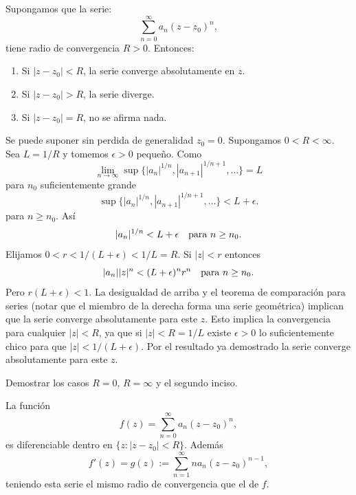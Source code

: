 \begin{teorema}  Supongamos que la serie:
\[
	\sum\limits_{n=0}^{\infty}a_n(z-z_0)^n,
\]
tiene radio de convergencia $R>0$. Entonces:
\begin{enumerate}
	\item Si $|z-z_0|<R$, la serie converge absolutamente en $z$.
	\item Si $|z-z_0|>R$, la serie diverge.
	\item Si $|z-z_0|=R$, no se afirma nada.

\end{enumerate}
\end{teorema}

 \begin{demo} Se puede suponer sin perdida de generalidad $z_0=0$. Supongamos $0<R<\infty$.  Sea $L=1/R$ y tomemos $\epsilon>0$ pequeño. Como
\[\lim_{n\to\infty}\sup\{|a_n|^{1/n},|a_{n+1}|^{1/n+1},\ldots\}=L\]
para $n_0$ suficientemente grande
\[\sup\{|a_n|^{1/n},|a_{n+1}|^{1/n+1},\ldots\}<L+\epsilon.\]
para $n\geq n_0$.   Así
\[|a_n|^{1/n}<L+\epsilon\quad\hbox{para } n\geq n_0.\]
Elijamos $0<r<1/(L+\epsilon)<1/L=R$. Si $|z|<r$ entonces
\[|a_n||z|^n<(L+\epsilon)^nr^n\quad\hbox{para } n\geq n_0.\]
Pero $r(L+\epsilon)<1$. La desigualdad de arriba y el teorema de comparación para series (notar que el miembro de la derecha forma una serie geométrica) implican que la serie converge absolutamente para este $z$.  Esto implica la convergencia para cualquier $|z|<R$, ya que si $|z|<R=1/L$ existe $\epsilon>0$ lo suficientemente chico para que $|z|<1/(L+\epsilon)$. Por el resultado ya demostrado la serie converge absolutamente para este $z$.\end{demo}
\begin{ejercicio} Demostrar los casos $R=0$, $R=\infty$ y el segundo inciso.
 \end{ejercicio}
\begin{teorema}  La función
\[
f(z)=	\sum\limits_{n=0}^{\infty}a_n(z-z_0)^n,
\]
es diferenciable dentro en $\{z:|z-z_0|<R\}$. Además
\[
f'(z)=g(z):=	\sum\limits_{n=1}^{\infty}na_n(z-z_0)^{n-1},
\]
teniendo esta serie el mismo radio de convergencia que el de $f$.
\end{teorema}

